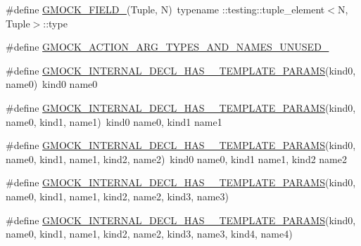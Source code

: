 \begin{DoxyCompactItemize}
\item 
\#define \mbox{\hyperlink{_obj__test_2lib_2googletest-release-1_88_81_2googlemock_2include_2gmock_2gmock-generated-actions_8h_a6eb3ce92b0613603057a20ec9e593317}{G\+M\+O\+C\+K\+\_\+\+F\+I\+E\+L\+D\+\_\+}}(Tuple,  N)~typename \+::testing\+::tuple\+\_\+element$<$N, Tuple$>$\+::type
\item 
\#define \mbox{\hyperlink{_obj__test_2lib_2googletest-release-1_88_81_2googlemock_2include_2gmock_2gmock-generated-actions_8h_a069f37fdbe36aabe65da6eb6221b9b19}{G\+M\+O\+C\+K\+\_\+\+A\+C\+T\+I\+O\+N\+\_\+\+A\+R\+G\+\_\+\+T\+Y\+P\+E\+S\+\_\+\+A\+N\+D\+\_\+\+N\+A\+M\+E\+S\+\_\+\+U\+N\+U\+S\+E\+D\+\_\+}}
\item 
\#define \mbox{\hyperlink{_obj__test_2lib_2googletest-release-1_88_81_2googlemock_2include_2gmock_2gmock-generated-actions_8h_a8b8b1a43495f82aefe40c410bc1ce392}{G\+M\+O\+C\+K\+\_\+\+I\+N\+T\+E\+R\+N\+A\+L\+\_\+\+D\+E\+C\+L\+\_\+\+H\+A\+S\+\_\+\_\+\+T\+E\+M\+P\+L\+A\+T\+E\+\_\+\+P\+A\+R\+A\+MS}}(kind0,  name0)~kind0 name0
\item 
\#define \mbox{\hyperlink{_obj__test_2lib_2googletest-release-1_88_81_2googlemock_2include_2gmock_2gmock-generated-actions_8h_aa238172d277a7ba189a5d481356a6c66}{G\+M\+O\+C\+K\+\_\+\+I\+N\+T\+E\+R\+N\+A\+L\+\_\+\+D\+E\+C\+L\+\_\+\+H\+A\+S\+\_\+\_\+\+T\+E\+M\+P\+L\+A\+T\+E\+\_\+\+P\+A\+R\+A\+MS}}(kind0,  name0,  kind1,  name1)~kind0 name0, kind1 name1
\item 
\#define \mbox{\hyperlink{_obj__test_2lib_2googletest-release-1_88_81_2googlemock_2include_2gmock_2gmock-generated-actions_8h_ae776d1f23c7b8defac49269c69e64baa}{G\+M\+O\+C\+K\+\_\+\+I\+N\+T\+E\+R\+N\+A\+L\+\_\+\+D\+E\+C\+L\+\_\+\+H\+A\+S\+\_\+\_\+\+T\+E\+M\+P\+L\+A\+T\+E\+\_\+\+P\+A\+R\+A\+MS}}(kind0,  name0,  kind1,  name1,  kind2,  name2)~kind0 name0, kind1 name1, kind2 name2
\item 
\#define \mbox{\hyperlink{_obj__test_2lib_2googletest-release-1_88_81_2googlemock_2include_2gmock_2gmock-generated-actions_8h_a19b48575600b1a046c3f77d5dfc124ba}{G\+M\+O\+C\+K\+\_\+\+I\+N\+T\+E\+R\+N\+A\+L\+\_\+\+D\+E\+C\+L\+\_\+\+H\+A\+S\+\_\+\_\+\+T\+E\+M\+P\+L\+A\+T\+E\+\_\+\+P\+A\+R\+A\+MS}}(kind0,  name0,  kind1,  name1,  kind2,  name2,  kind3,  name3)
\item 
\#define \mbox{\hyperlink{_obj__test_2lib_2googletest-release-1_88_81_2googlemock_2include_2gmock_2gmock-generated-actions_8h_aef0f11711d63f65561ce5a4d032673f8}{G\+M\+O\+C\+K\+\_\+\+I\+N\+T\+E\+R\+N\+A\+L\+\_\+\+D\+E\+C\+L\+\_\+\+H\+A\+S\+\_\+\_\+\+T\+E\+M\+P\+L\+A\+T\+E\+\_\+\+P\+A\+R\+A\+MS}}(kind0,  name0,  kind1,  name1,  kind2,  name2,  kind3,  name3,  kind4,  name4)

\end{DoxyCompactItemize}
